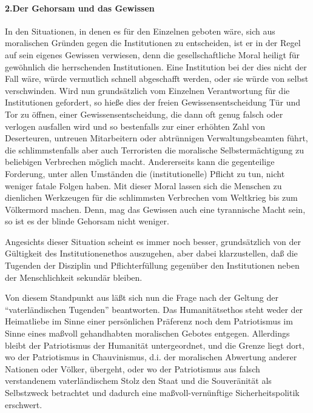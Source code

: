 \documentclass[12pt,a4paper]{article}
\begin{document}
\paragraph{2.Der Gehorsam und das Gewissen}

In den Situationen, in denen es für den Einzelnen geboten wäre, sich aus
moralischen Gründen gegen die Institutionen zu entscheiden, ist er in der
Regel auf sein eigenes Gewissen verwiesen, denn die gesellschaftliche Moral
heiligt für gewöhnlich die herrschenden Institutionen. Eine Institution bei
der dies nicht der Fall wäre, würde vermutlich schnell abgeschafft werden,
oder sie würde von selbst verschwinden. Wird nun grundsätzlich vom Einzelnen
Verantwortung für die Institutionen gefordert, so hieße dies der freien
Gewissensentscheidung Tür und Tor zu öffnen, einer Gewissensentscheidung, die
dann oft genug falsch oder verlogen ausfallen wird und so bestenfalls zur
einer erhöhten Zahl von Deserteuren, untreuen Mitarbeitern oder abtrünnigen
Verwaltungsbeamten führt, die schlimmstenfalls aber auch Terroristen die
moralische Selbstermächtigung zu beliebigen Verbrechen möglich macht.
Andererseits kann die gegenteilige Forderung, unter allen Umständen die
(institutionelle) Pflicht zu tun, nicht weniger fatale Folgen haben. Mit
dieser Moral lassen sich die Menschen zu dienlichen Werkzeugen für die
schlimmsten Verbrechen vom Weltkrieg bis zum Völkermord machen. Denn, mag das
Gewissen auch eine tyrannische Macht sein, so ist es der blinde Gehorsam
nicht weniger.

Angesichts dieser Situation scheint es immer noch besser,
grundsätzlich von der Gültigkeit des Institutionenethos auszugehen, aber
dabei klarzustellen, daß die Tugenden der Disziplin und Pflichterfüllung
gegenüber den Institutionen neben der Menschlichkeit sekundär bleiben.

Von diesem Standpunkt aus läßt sich nun die Frage nach der Geltung der
"`vaterländischen Tugenden"' beantworten. Das Humanitätsethos steht weder
der Heimatliebe im Sinne einer persönlichen Präferenz noch dem
Patriotismus im Sinne eines maßvoll gehandhabten moralischen Gebotes
entgegen. Allerdings bleibt der Patriotismus der Humanität untergeordnet, und
die Grenze liegt dort, wo der Patriotismus in Chauvinismus, d.i. der
moralischen Abwertung anderer Nationen oder Völker, übergeht, oder wo der
Patriotismus aus falsch verstandenem vaterländischem Stolz den Staat und die
Souveränität als Selbstzweck betrachtet und dadurch eine
maßvoll-vernünftige Sicherheitspolitik erschwert.
\end{document}
